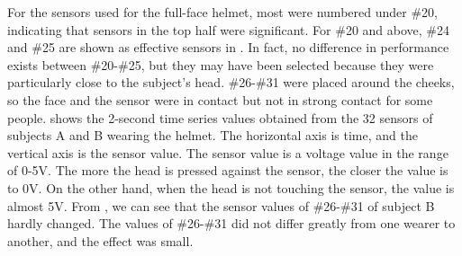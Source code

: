 \documentclass[english,preprint,JIP]{ipsj}
\begin{document}
For the sensors used for the full-face helmet, most were numbered under \#20, indicating that sensors in the top half were significant. For \#20 and above, \#24 and \#25 are shown as effective sensors in . In fact, no difference in performance exists between \#20-\#25, but they may have been selected because they were particularly close to the subject's head. \#26-\#31 were placed around the cheeks, so the face and the sensor were in contact but not in strong contact for some people.  shows the 2-second time series values obtained from the 32 sensors of subjects A and B wearing the helmet. The horizontal axis is time, and the vertical axis is the sensor value. The sensor value is a voltage value in the range of 0-5V. The more the head is pressed against the sensor, the closer the value is to 0V. On the other hand, when the head is not touching the sensor, the value is almost 5V. From , we can see that the sensor values of \#26-\#31 of subject B hardly changed. The values of \#26-\#31 did not differ greatly from one wearer to another, and the effect was small.
\end{document}
